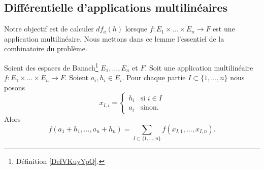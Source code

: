 \subsection{Différentielle d'applications multilinéaires}

Notre objectif est de calculer \( df_a(h)\) lorsque \(f \colon E_1\times \ldots\times E_n\to F  \) est une application multilinéaire. Nous mettons dans ce lemme l'essentiel de la combinatoire du problème.
\begin{lemma}	\label{LEMooOHRGooBKevzM}
	Soient des espaces de Banach\footnote{Définition \ref{DefVKuyYpQ}.} \( E_1,\ldots,E_n\) et \( F\). Soit une application multilinéaire \(f \colon E_1\times\ldots\times E_n\to F  \). Soient \( a_i,h_i\in E_i\). Pour chaque partie \( I\subset\{ 1,\ldots,n \}\) nous posons
	\begin{equation}
		x_{I,i}=\begin{cases}
			h_i & \text{si } i\in I \\
			a_i & \text{sinon. }
		\end{cases}
	\end{equation}
	Alors
	\begin{equation}		\label{EQooTNALooHjpmWv}
		f(a_1+h_1,\ldots,a_n+h_n)=\sum_{I\subset\{ 1,\ldots,n \}}f(x_{I,1},\ldots,x_{I,n}).
	\end{equation}
\end{lemma}

